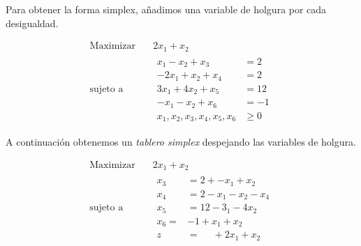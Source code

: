 \documentclass{article}
\begin{document}
Para obtener la forma simplex, añadimos una variable de holgura por
cada desigualdad.

\begin{equation*}
 \begin{aligned}
\text{Maximizar} \quad & 2x_{1}+x_{2}\\
\text{sujeto a} \quad &
  \begin{aligned}
   x_{1}-x_{2}+x_{3}              &  =2\\
   -2x_{1}+x_{2}+x_{4} &=2\\
   3x_{1}+4x_{2}+x_{5} &=    12\\
  - x_{1}-x_{2}+x_{6} &=    -1\\
    x_{1},x_{2},x_{3},x_{4},x_{5},x_{6} &\geq 0
  \end{aligned}
\end{aligned}
\end{equation*}

A continuación obtenemos un \emph{tablero simplex} despejando las
variables de holgura.

\begin{equation*}
 \begin{aligned}
\text{Maximizar} \quad & 2x_{1}+x_{2}\\
\text{sujeto a} \quad &
\begin{aligned}
  x_{3}&= 2+-x_{1 }+x_{2} \\
  x_{4}&=2-x_{1}-x_{2}-x_{4}\\
  x_{5}&=12-3_{1}-4x_{2}\\
  x_{6}=&-1+x_{1}+x_{2}\\
  \hline
  z&=\phantom{-1}+2x_{1}+x_{2}
  \end{aligned}
\end{aligned}
\end{equation*}
\end{document}
